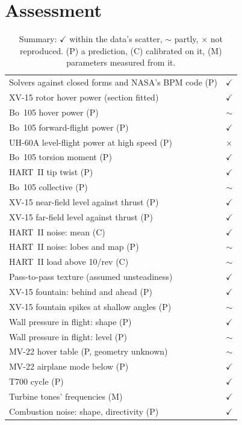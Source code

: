 \documentclass[10pt,a4paper,twocolumn]{article}
\newcommand{\ok}{\textcolor{green!45!black}{\ensuremath{\checkmark}}}
\newcommand{\nok}{\textcolor{red!70!black}{\ensuremath{\times}}}
\newcommand{\pok}{\textcolor{orange!85!black}{\ensuremath{\sim}}}
\begin{document}
\section{Assessment}\label{sec:assess}
\begin{table}[t]
\centering\small
\caption{Summary: \ok{} within the data's scatter, \pok{} partly, \nok{} not reproduced. (P) a prediction, (C) calibrated on it, (M) parameters measured from it.}\label{tab:score}
\begin{tabularx}{\columnwidth}{@{}>{\raggedright\arraybackslash}Xc@{}}
\toprule
Solvers against closed forms and NASA's BPM code (P) & \ok \\
XV-15 rotor hover power (section fitted) & \ok \\
Bo~105 hover power (P) & \pok \\
Bo~105 forward-flight power (P) & \ok \\
UH-60A level-flight power at high speed (P) & \nok \\
Bo~105 torsion moment (P) & \ok \\
HART~II tip twist (P) & \ok \\
Bo~105 collective (P) & \pok \\
XV-15 near-field level against thrust (P) & \ok \\
XV-15 far-field level against thrust (P) & \ok \\
HART~II noise: mean (C) & \ok \\
HART~II noise: lobes and map (P) & \pok \\
HART~II load above 10/rev (C) & \pok \\
Pass-to-pass texture (assumed unsteadiness) & \ok \\
XV-15 fountain: behind and ahead (P) & \ok \\
XV-15 fountain spikes at shallow angles (P) & \pok \\
Wall pressure in flight: shape (P) & \ok \\
Wall pressure in flight: level (P) & \pok \\
MV-22 hover table (P, geometry unknown) & \pok \\
MV-22 airplane mode below (P) & \ok \\
T700 cycle (P) & \ok \\
Turbine tones' frequencies (M) & \ok \\
Combustion noise: shape, directivity (P) & \ok \\

\end{tabularx}
\end{table}
\end{document}
